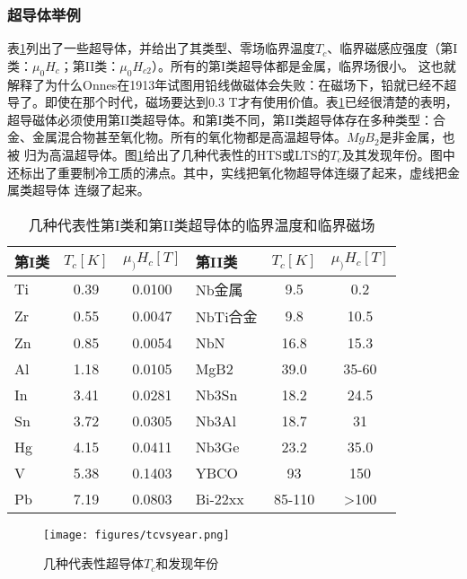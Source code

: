 \subsubsection{超导体举例}
表\ref{criticalparameters}列出了一些超导体，并给出了其类型、零场临界温度$T_c$、临界磁感应强度（第I类：$\mu_0H_c$；第II类：$\mu_0H_{c2}$）。所有的第I类超导体都是金属，临界场很小。
这也就解释了为什么Onnes在1913年试图用铅线做磁体会失败：在磁场下，铅就已经不超导了。即使在那个时代，磁场要达到0.3 T才有使用价值。表\ref{criticalparameters}已经很清楚的表明，
超导磁体必须使用第II类超导体。和第I类不同，第II类超导体存在多种类型：合金、金属混合物甚至氧化物。所有的氧化物都是高温超导体。$MgB_2$是非金属，也被
归为高温超导体。图\ref{tcvsyear}给出了几种代表性的HTS或LTS的$T_c$及其发现年份。图中还标出了重要制冷工质的沸点。其中，实线把氧化物超导体连缀了起来，虚线把金属类超导体
连缀了起来。
\begin{table}[htbp]\small
  \centering
  \caption{几种代表性第I类和第II类超导体的临界温度和临界磁场} \label{criticalparameters}
  \begin{tabular}{|l|c|c||l|c|c|}
    \hline
    第I类 & $T_c[K]$ & $\mu_)H_c[T]$ & 第II类 & $T_c[K]$ & $\mu_)H_c[T]$ \\ \hline \hline
    Ti & 0.39 & 0.0100 & Nb金属 & 9.5 & 0.2 \\ \hline
    Zr & 0.55 & 0.0047 & NbTi合金 & 9.8 & 10.5 \\ \hline
    Zn & 0.85 & 0.0054 &NbN & 16.8 & 15.3 \\ \hline
    Al & 1.18 & 0.0105&MgB2 & 39.0 & 35-60\\ \hline
    In & 3.41 & 0.0281 & Nb3Sn & 18.2 & 24.5  \\ \hline
    Sn & 3.72 & 0.0305  & Nb3Al & 18.7 & 31\\ \hline
    Hg & 4.15 & 0.0411  & Nb3Ge & 23.2 & 35.0\\ \hline
    V & 5.38 & 0.1403& YBCO & 93 & 150\\ \hline
    Pb & 7.19 & 0.0803 & Bi-22xx & 85-110 & >100 \\
    \hline
  \end{tabular}
\end{table}

\begin{figure}
  \centering
 \texttt{[image: figures/tcvsyear.png]}
  \caption{
几种代表性超导体$T_c$和发现年份
}\label{tcvsyear}
\end{figure}


